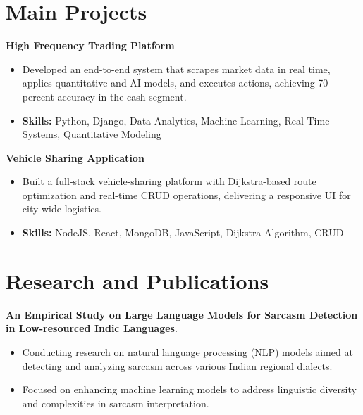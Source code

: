 \documentclass[a4paper,11pt]{article}
\begin{document}
\section{\textbf{Main Projects}}

\vspace{1mm}
  \textbf{High Frequency Trading Platform  }
\vspace{-1.5mm} %
\begin{itemize}
  \item Developed an end-to-end system that scrapes market data in real time, applies quantitative and AI models, and executes actions, achieving 70 percent accuracy in the cash segment.
\vspace{-3mm}
  \item \textbf{Skills:} Python, Django, Data Analytics, Machine Learning, Real-Time Systems, Quantitative Modeling
\end{itemize}


\vspace{1mm}
   \textbf{Vehicle Sharing Application }
\vspace{-1.5mm} %
\begin{itemize}
  \item Built a full-stack vehicle-sharing platform with Dijkstra-based route optimization and real-time CRUD operations, delivering a responsive UI for city-wide logistics.
\vspace{-3mm}
  \item \textbf{Skills:} NodeJS, React, MongoDB, JavaScript, Dijkstra Algorithm, CRUD
\end{itemize}



\section{\textbf{Research and Publications} \hfill }
\vspace{1mm}
  \textbf{An Empirical Study on Large Language Models for Sarcasm Detection in Low-resourced Indic Languages}.
\vspace{-1mm} %
\begin{itemize}
  \item Conducting research on natural language processing (NLP) models aimed at detecting and analyzing sarcasm across various Indian regional dialects.
\vspace{-3mm}
  \item Focused on enhancing machine learning models to address linguistic diversity and complexities in sarcasm interpretation.
\end{itemize}
\end{document}
